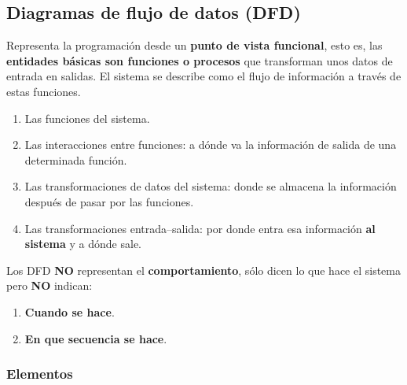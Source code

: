 \subsection{Diagramas de flujo de datos (DFD)}
Representa la programación desde un \textbf{punto de vista funcional}, esto es, las \textbf{entidades básicas son funciones o procesos} que transforman unos datos de entrada en salidas. El sistema se describe como el flujo de información a través de estas funciones. 
\begin{enumerate}
    \item Las funciones del sistema. 
    \item Las interacciones entre funciones: a dónde va la información de salida de una determinada función. 
    \item Las transformaciones de datos del sistema: donde se almacena la información después de pasar por las funciones.
    \item Las transformaciones entrada--salida: por donde entra esa información \textbf{al sistema} y a dónde sale. %
\end{enumerate}
Los DFD \textbf{NO} representan el \textbf{comportamiento}, sólo dicen lo que hace el sistema pero \textbf{NO} indican: %
\begin{enumerate}
    \item \textbf{Cuando se hace}. 
    \item \textbf{En que secuencia se hace}.
\end{enumerate}


\subsubsection{Elementos}

